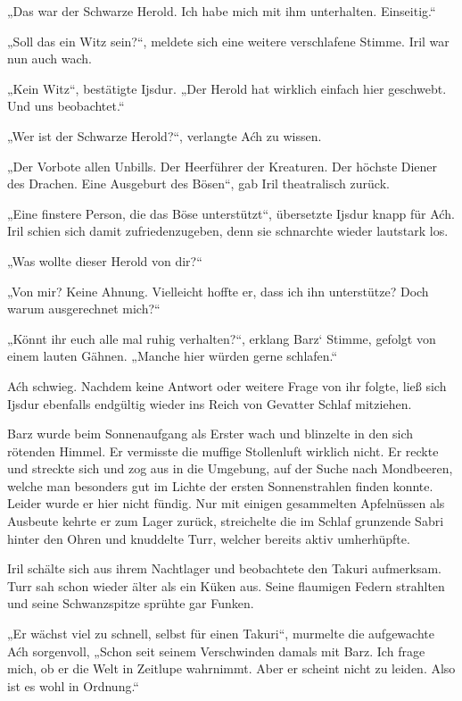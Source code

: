 „Das war der Schwarze Herold. Ich habe mich mit ihm unterhalten. Einseitig.“

„Soll das ein Witz sein?“, meldete sich eine weitere verschlafene Stimme. Iril war nun auch wach.

„Kein Witz“, bestätigte Ijsdur. „Der Herold hat wirklich einfach hier geschwebt. Und uns beobachtet.“

„Wer ist der Schwarze Herold?“, verlangte Aćh zu wissen.

„Der Vorbote allen Unbills. Der Heerführer der Kreaturen. Der höchste Diener des Drachen. Eine Ausgeburt des Bösen“, gab Iril theatralisch zurück.

„Eine finstere Person, die das Böse unterstützt“, übersetzte Ijsdur knapp für Aćh. Iril schien sich damit zufriedenzugeben, denn sie schnarchte wieder lautstark los.

„Was wollte dieser Herold von dir?“

„Von mir? Keine Ahnung. Vielleicht hoffte er, dass ich ihn unterstütze? Doch warum ausgerechnet mich?“

„Könnt ihr euch alle mal ruhig verhalten?“, erklang Barz‘ Stimme, gefolgt von einem lauten Gähnen. „Manche hier würden gerne schlafen.“

Aćh schwieg. Nachdem keine Antwort oder weitere Frage von ihr folgte, ließ sich Ijsdur ebenfalls endgültig wieder ins Reich von Gevatter Schlaf mitziehen.\bigskip







Barz wurde beim Sonnenaufgang als Erster wach und blinzelte in den sich rötenden Himmel. Er vermisste die muffige Stollenluft wirklich nicht. Er reckte und streckte sich und zog aus in die Umgebung, auf der Suche nach Mondbeeren, welche man besonders gut im Lichte der ersten Sonnenstrahlen finden konnte. Leider wurde er hier nicht fündig. Nur mit einigen gesammelten Apfelnüssen als Ausbeute kehrte er zum Lager zurück, streichelte die im Schlaf grunzende Sabri hinter den Ohren und knuddelte Turr, welcher bereits aktiv umherhüpfte.

Iril schälte sich aus ihrem Nachtlager und beobachtete den Takuri aufmerksam. Turr sah schon wieder älter als ein Küken aus. Seine flaumigen Federn strahlten und seine Schwanzspitze sprühte gar Funken.

„Er wächst viel zu schnell, selbst für einen Takuri“, murmelte die aufgewachte Aćh sorgenvoll, „Schon seit seinem Verschwinden damals mit Barz. Ich frage mich, ob er die Welt in Zeitlupe wahrnimmt. Aber er scheint nicht zu leiden. Also ist es wohl in Ordnung.“

